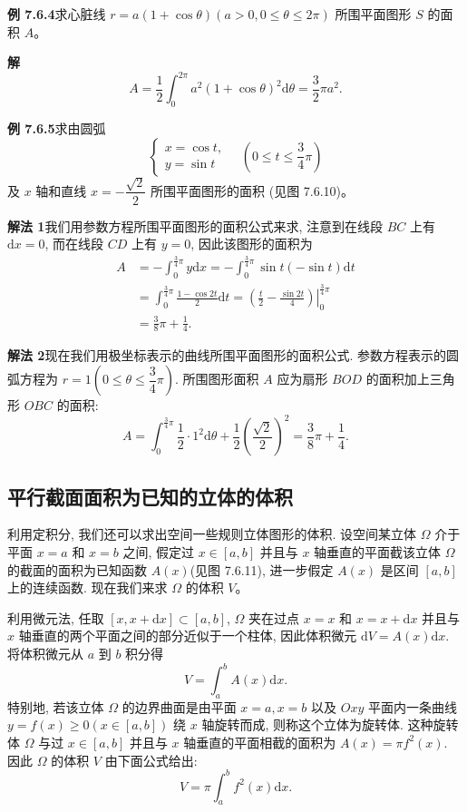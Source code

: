 \documentclass[UTF8,12pt,a4paper,fontset=fandol]{ctexart}
\begin{document}
\noindent\textbf{例 7.6.4}\quad 求心脏线 $r=a(1+\cos\theta)(a>0,0\leq\theta\leq2\pi)$ 所围平面图形 $S$ 的面积 $A$。

\noindent\textbf{解}\quad
\[
  A=\frac{1}{2}\int_0^{2\pi}a^2(1+\cos\theta)^2\mathrm d\theta=\frac{3}{2}\pi a^2.
\]

\noindent\textbf{例 7.6.5}\quad 求由圆弧
\[
  \begin{cases}
    x=\cos t,\\
    y=\sin t
  \end{cases}
  \quad\left(0\leq t\leq\frac{3}{4}\pi\right)
\]
及 $x$ 轴和直线 $x=-\dfrac{\sqrt2}{2}$ 所围平面图形的面积 (见图 7.6.10)。

\noindent\textbf{解法 1}\quad 我们用参数方程所围平面图形的面积公式来求, 注意到在线段 $BC$ 上有 $\mathrm dx=0$, 而在线段 $CD$ 上有 $y=0$, 因此该图形的面积为
\[
\begin{aligned}
  A&=-\int_0^{\frac34\pi}y\mathrm dx
  =-\int_0^{\frac34\pi}\sin t(-\sin t)\mathrm dt\\
  &=\int_0^{\frac34\pi}\frac{1-\cos2t}{2}\mathrm dt
  =\left.\left(\frac{t}{2}-\frac{\sin2t}{4}\right)\right|_0^{\frac34\pi}\\
  &=\frac{3}{8}\pi+\frac{1}{4}.
\end{aligned}
\]

\noindent\textbf{解法 2}\quad 现在我们用极坐标表示的曲线所围平面图形的面积公式. 参数方程表示的圆弧方程为 $r=1\left(0\leq\theta\leq\dfrac{3}{4}\pi\right)$. 所围图形面积 $A$ 应为扇形 $BOD$ 的面积加上三角形 $OBC$ 的面积:
\[
  A=\int_0^{\frac34\pi}\frac{1}{2}\cdot1^2\mathrm d\theta
  +\frac{1}{2}\left(\frac{\sqrt2}{2}\right)^2
  =\frac{3}{8}\pi+\frac{1}{4}.
\]

\subsection{平行截面面积为已知的立体的体积}

利用定积分, 我们还可以求出空间一些规则立体图形的体积. 设空间某立体 $\Omega$ 介于平面 $x=a$ 和 $x=b$ 之间, 假定过 $x\in[a,b]$ 并且与 $x$ 轴垂直的平面截该立体 $\Omega$ 的截面的面积为已知函数 $A(x)$(见图 7.6.11), 进一步假定 $A(x)$ 是区间 $[a,b]$ 上的连续函数. 现在我们来求 $\Omega$ 的体积 $V$。

利用微元法, 任取 $[x,x+\mathrm dx]\subset[a,b]$, $\Omega$ 夹在过点 $x=x$ 和 $x=x+\mathrm dx$ 并且与 $x$ 轴垂直的两个平面之间的部分近似于一个柱体, 因此体积微元 $\mathrm dV=A(x)\mathrm dx$. 将体积微元从 $a$ 到 $b$ 积分得
\[
  V=\int_a^b A(x)\mathrm dx.
\]
特别地, 若该立体 $\Omega$ 的边界曲面是由平面 $x=a,x=b$ 以及 $Oxy$ 平面内一条曲线 $y=f(x)\geq0(x\in[a,b])$ 绕 $x$ 轴旋转而成, 则称这个立体为旋转体. 这种旋转体 $\Omega$ 与过 $x\in[a,b]$ 并且与 $x$ 轴垂直的平面相截的面积为 $A(x)=\pi f^2(x)$. 因此 $\Omega$ 的体积 $V$ 由下面公式给出:
\[
  V=\pi\int_a^b f^2(x)\mathrm dx.
\]
\end{document}
